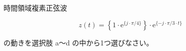 時間領域複素正弦波

\[
z(t) =  \left \{ 1 \cdot \textrm{e}^{\{j \cdot \pi/4 \}} \right \} \cdot \textrm{e}^{\{ -j \cdot \pi/3 \cdot t \}}
\]

\medskip
\noindent の動きを選択肢 a〜d の中から1つ選びなさい。

